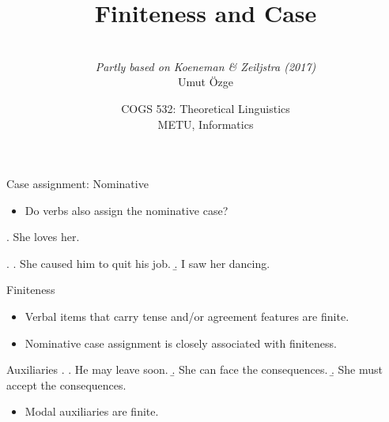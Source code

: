 \documentclass[ignorenonframetext,10pt,aspectratio=169]{beamer}
\title{Finiteness and Case}
\author{\  \\  {\it Partly based on Koeneman \& Zeiljstra (2017)} \\ \vspace{20pt} Umut \"Ozge\\  }
\date{COGS 532: Theoretical Linguistics\\ METU, Informatics}
\begin{document}
\begin{frame}\frametitle{}
\thispagestyle{empty}
\maketitle
\end{frame}

\begin{frame}[t,plain]{Case assignment: Nominative}
\begin{itemize}
		\item Do verbs also assign the nominative case?
\end{itemize}

\ex. She loves her. 

		\vspace{40pt}

\pause

\ex. \a. She caused him to quit his job.
\b. I saw her dancing.

\end{frame}

\begin{frame}{Finiteness}

		\begin{itemize}
				\item Verbal items that carry tense and/or agreement features are \alert{finite}.
				\item Nominative case assignment is closely associated with finiteness.
		\end{itemize}

\begin{center}
\end{center}


\end{frame}

\begin{frame}[t,plain]{Auxiliaries}
				\ex.
				\a. He may leave soon.
				\b. She can face the consequences.
				\b. She must accept the consequences.

				\begin{itemize}

								\item Modal auxiliaries are finite.

				\end{itemize}

\end{frame}
\end{document}
